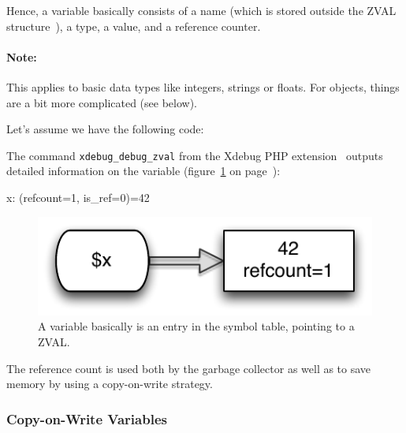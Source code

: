 Hence, a variable basically consists of a name (which is stored outside the ZVAL structure~\cite{php-extensions-zval}), a type, a value, and a reference counter.

\paragraph{Note:} This applies to basic data types like integers, strings or floats. For objects, things are a bit more complicated (see below).

Let's assume we have the following code:


The command \texttt{xdebug\_debug\_zval} from the Xdebug PHP extension~\cite{xdebug-functions} outputs detailed information on the variable (figure~\ref{fig:simple-variable} on page~\pageref{fig:simple-variable}):

\begin{textcode}
x: (refcount=1, is_ref=0)=42
\end{textcode}

\begin{figure}[htb]
  \begin{center}
    \includegraphics[scale=0.8]{images/x_42}
    \caption{A variable basically is an entry in the symbol table, pointing to a ZVAL.}
    \label{fig:simple-variable}
  \end{center}
\end{figure}

The reference count is used both by the garbage collector as well as to save memory by using a copy-on-write strategy.~\cite{php-manual-reference-counting}


\subsubsection{Copy-on-Write Variables}
\label{sec:copy-on-write}

